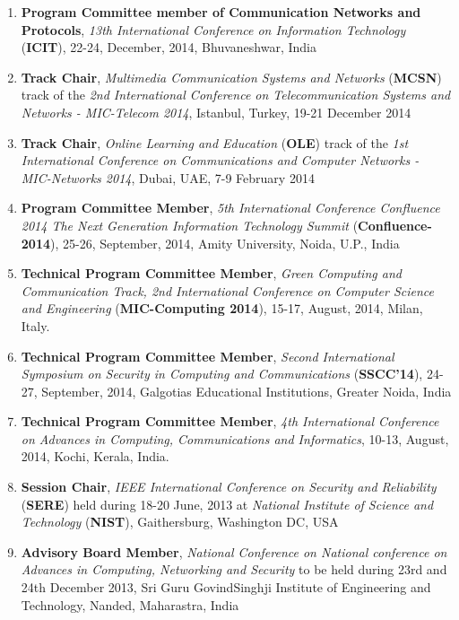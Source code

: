 \begin{enumerate}
\item
\textbf{Program Committee member of Communication Networks and Protocols}, \textit{13th International Conference on Information Technology} (\textbf{ICIT}), 22-24, December, 2014, Bhuvaneshwar, India

\item
\textbf{Track Chair}, \textit{Multimedia Communication Systems and Networks }(\textbf{MCSN}) track of the \textit{2nd International Conference on Telecommunication Systems and Networks - MIC-Telecom 2014}, Istanbul, Turkey, 19-21 December 2014 

\item
\textbf{Track Chair}, \textit{Online Learning and Education} (\textbf{OLE}) track of the \textit{1st International Conference on Communications and Computer Networks - MIC-Networks 2014}, Dubai, UAE, 7-9 February 2014

\item
\textbf{Program Committee Member}, \textit{5th International Conference Confluence 2014 The Next Generation Information Technology Summit} (\textbf{Confluence-2014}), 25-26, September, 2014, Amity University, Noida, U.P., India

\item
\textbf{Technical Program Committee Member}, \textit{Green Computing and Communication Track, 2nd International Conference on Computer Science and Engineering} (\textbf{MIC-Computing 2014}), 15-17, August, 2014, Milan, Italy.

\item
\textbf{Technical Program Committee Member},\textit{ Second International Symposium on Security in Computing and Communications} (\textbf{SSCC’14}), 24-27, September, 2014, Galgotias Educational Institutions, Greater Noida, India

\item
\textbf{Technical Program Committee Member}, \textit{4th International Conference on Advances in Computing, Communications and Informatics}, 10-13, August, 2014, Kochi, Kerala, India.

\item
\textbf{Session Chair}, \textit{IEEE International Conference on Security and Reliability} (\textbf{SERE}) held during 18-20 June, 2013 at\textit{ National Institute of Science and Technology} (\textbf{NIST}), Gaithersburg, Washington DC, USA

\item
\textbf{Advisory Board Member}, \textit{National Conference on National conference on Advances in Computing, Networking and Security} to be held during 23rd and 24th December 2013, Sri Guru GovindSinghji Institute of Engineering and Technology, Nanded, Maharastra, India


\end{enumerate}
